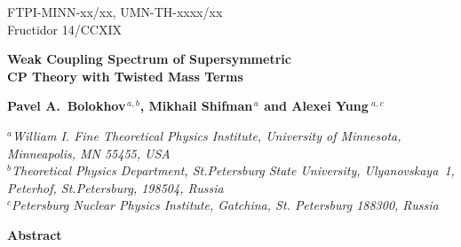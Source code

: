 \documentclass[epsfig,12pt]{article}
\begin{document}



\begin{titlepage}

\begin{flushright}
FTPI-MINN-xx/xx, UMN-TH-xxxx/xx\\
Fructidor 14/CCXIX
\end{flushright}

\vspace{1.1cm}

\begin{center}
{  \Large \bf  
			Weak Coupling Spectrum of Supersymmetric\\[3mm]
			CP Theory with Twisted Mass Terms
}
\end{center}
\vspace{0.6cm}

\begin{center}

 {\large
 \bf   Pavel A.~Bolokhov$^{\,a,b}$,  Mikhail Shifman$^{\,a}$ and \bf Alexei Yung$^{\,\,a,c}$}
\end {center}

\begin{center}

$^a${\it  William I. Fine Theoretical Physics Institute, University of Minnesota,
Minneapolis, MN 55455, USA}\\
$^b${\it Theoretical Physics Department, St.Petersburg State University, Ulyanovskaya~1, 
	 Peterhof, St.Petersburg, 198504, Russia}\\
$^{c}${\it Petersburg Nuclear Physics Institute, Gatchina, St. Petersburg
188300, Russia
}
\end{center}


\vspace{0.7cm}


\begin{center}
{\large\bf Abstract}
\end{center}

\hspace{0.3cm}
\vspace{2cm}

\end{titlepage}

\newpage

\end{document}
